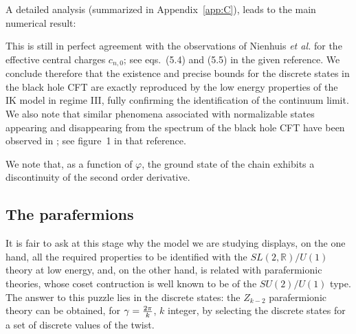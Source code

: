 \documentclass[11pt]{article}
\begin{document}
A detailed  analysis (summarized   in Appendix~\ref{app:C}), leads to  the main numerical  result:

{\centering
{} }


This is still in perfect agreement with the observations of Nienhuis {\em et al.} \cite{Nienhuis} for the effective central charges $c_{n,0}$; see eqs.~(5.4) and (5.5) in the given reference. We conclude therefore that the existence and precise bounds for the discrete states in the black hole CFT are exactly reproduced by the low energy properties of the IK model in regime III, fully confirming the identification of the continuum limit. We also note that similar phenomena associated with normalizable states appearing and disappearing from the spectrum of the black hole CFT have been observed in \cite{Giveon}; see figure~1 in that reference.


We note that, as a function of $\varphi$, the ground state of the chain exhibits a discontinuity of the second order derivative. 



\subsection{The parafermions}

It is fair to ask at this stage why the model we are studying displays, on the one hand, all the required properties to be identified with the $SL(2,\mathbb{R})/U(1)$ theory at low energy, and, on the other hand, is related with parafermionic theories, whose coset contruction is well known to be of the $SU(2)/U(1)$ type. The answer to this puzzle lies in the discrete states: the $Z_{k-2}$ parafermionic theory can be obtained, for $\gamma={2\pi\over k}$, $k$ integer, by selecting the discrete states for a set of discrete values of the twist.
\end{document}
